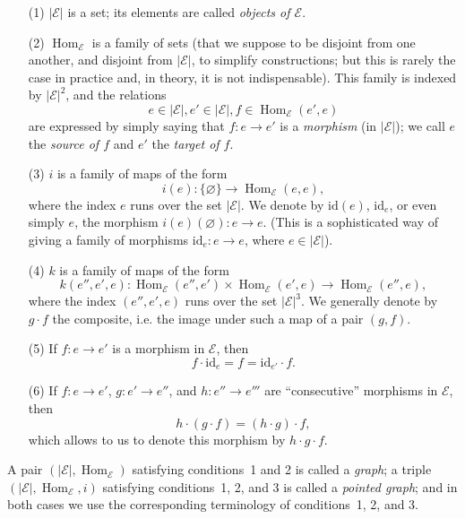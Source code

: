 \documentclass{article}
\newcommand{\oldpage}[1]{\marginpar{\footnotesize$\Big\vert$ \textit{p.~#1}}}
\newcommand{\id}{\mathrm{id}}
\newcommand{\cat}[1]{\mathcal{#1}}
\newcommand{\set}[1]{|#1|}
\DeclareMathOperator{\Hom}{Hom}
\begin{document}
\begin{enumerate}
  \item[(1)] $\set{\cat{E}}$ is a set; its elements are called \emph{objects of $\cat{E}$}.

  \item[(2)] $\Hom_\cat{E}$ is a family of sets (that we suppose to be disjoint from one another, and disjoint from $\set{\cat{E}}$, to simplify constructions; but this is rarely the case in practice and, in theory, it is not indispensable).
    This family is indexed by $\set{\cat{E}}^2$, and the relations
    \[
      e\in\set{\cat{E}},
      e'\in\set{\cat{E}},
      f\in\Hom_\cat{E}(e',e)
    \]
    are expressed by simply saying that $f\colon e\to e'$ is a \emph{morphism} (in $\set{\cat{E}}$);
    we call $e$ the \emph{source of $f$} and $e'$ the \emph{target of $f$}.

  \item[(3)] $i$ is a family of maps of the form
    \[
      i(e)\colon \{\varnothing\}
      \to \Hom_\cat{E}(e,e),
    \]
    where the index $e$ runs over the set $\set{\cat{E}}$.
    We denote by $\id(e)$, $\id_e$, or even simply $e$, the morphism $i(e)(\varnothing)\colon e\to e$.
    \oldpage{220}
    (This is a sophisticated way of giving a family of morphisms $\id_e\colon e\to e$, where $e\in\set{\cat{E}}$).

  \item[(4)] $k$ is a family of maps of the form
    \[
      k(e'',e',e)\colon
      \Hom_\cat{E}(e'',e')\times\Hom_\cat{E}(e',e)
      \to \Hom_\cat{E}(e'',e),
    \]
    where the index $(e'',e',e)$ runs over the set $\set{\cat{E}}^3$.
    We generally denote by $g\cdot f$ the composite, i.e. the image under such a map of a pair $(g,f)$.

  \item[(5)] If $f\colon e\to e'$ is a morphism in $\cat{E}$, then
    \[
      f\cdot\id_e
      = f
      = \id_{e'}\cdot f.
    \]

  \item[(6)] If $f\colon e\to e'$, $g\colon e'\to e''$, and $h\colon e''\to e'''$ are ``consecutive'' morphisms in $\cat{E}$, then
    \[
      h\cdot(g\cdot f)
      = (h\cdot g)\cdot f,
    \]
    which allows to us to denote this morphism by $h\cdot g\cdot f$.
\end{enumerate}

A pair $(\set{\cat{E}},\Hom_\cat{E})$ satisfying conditions~1 and 2 is called a \emph{graph}; a triple $(\set{\cat{E}},\Hom_\cat{E},i)$ satisfying conditions~1, 2, and 3 is called a \emph{pointed graph}; and in both cases we use the corresponding terminology of conditions~1, 2, and 3.
\end{document}
